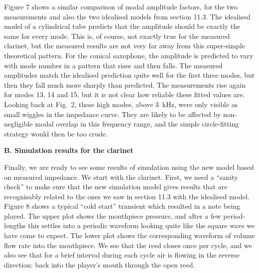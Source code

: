   Figure 7 shows a similar comparison of modal amplitude factors, for the two 
  measurements and also the two idealised models from section 11.3. The 
  idealised model of a cylindrical tube predicts that the amplitude should be 
  exactly the same for every mode. This is, of course, not exactly true for the 
  measured clarinet, but the measured results are not very far away from this 
  super-simple theoretical pattern. For the conical saxophone, the amplitude is 
  predicted to vary with mode number in a pattern that rises and then falls. 
  The measured amplitudes match the idealised prediction quite well for the 
  first three modes, but then they fall much more sharply than predicted. The 
  measurements rise again for modes 13, 14 and 15, but it is not clear how 
  reliable these fitted values are. Looking back at Fig.\ 2, these high modes, 
  above 3~kHz, were only visible as small wiggles in the impedance curve. They 
  are likely to be affected by non-negligible modal overlap in this frequency 
  range, and the simple circle-fitting strategy would then be too crude. 


  \textbf{B. Simulation results for the clarinet} 

  Finally, we are ready to see some results of simulation using the new model 
  based on measured impedance. We start with the clarinet. First, we need a 
  “sanity check” to make sure that the new simulation model gives results that 
  are recognisably related to the ones we saw in section 11.3 with the 
  idealised model. Figure 8 shows a typical “cold start” transient which 
  resulted in a note being played. The upper plot shows the mouthpiece 
  pressure, and after a few period-lengths this settles into a periodic 
  waveform looking quite like the square wave we have come to expect. The lower 
  plot shows the corresponding waveform of volume flow rate into the 
  mouthpiece. We see that the reed closes once per cycle, and we also see that 
  for a brief interval during each cycle air is flowing in the reverse 
  direction: back into the player’s mouth through the open reed. 


